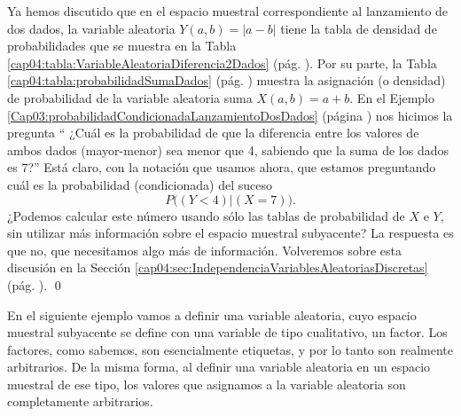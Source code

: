 \begin{Ejemplo}\label{cap04:ejem:VariablesAleatoriasEliminanInformacion}
    Ya hemos discutido que en el espacio muestral correspondiente al lanzamiento de dos dados, la variable aleatoria $Y(a,b)=|a-b|$ tiene la tabla de densidad de probabilidades que se muestra en la Tabla \ref{cap04:tabla:VariableAleatoriaDiferencia2Dados} (pág. \pageref{cap04:tabla:VariableAleatoriaDiferencia2Dados}).
    Por su parte, la Tabla \ref{cap04:tabla:probabilidadSumaDados} (pág. \pageref{cap04:tabla:probabilidadSumaDados}) muestra la asignación (o densidad) de probabilidad de la variable aleatoria suma $X(a,b)=a+b$.
    En el Ejemplo \ref{Cap03:probabilidadCondicionadaLanzamientoDosDados} (página \pageref{Cap03:probabilidadCondicionadaLanzamientoDosDados}) nos hicimos la pregunta `` ¿Cuál es la probabilidad de que la diferencia entre los valores de ambos dados (mayor-menor) sea menor que 4, sabiendo que la suma de los dados es 7?''  Está claro, con la notación que usamos ahora, que estamos preguntando cuál es la probabilidad (condicionada) del suceso
    \[P\Big((Y<4)|(X=7)\Big).\]
    ¿Podemos calcular este número usando sólo las tablas de probabilidad de $X$ e $Y$, sin utilizar más información sobre el espacio muestral subyacente? La respuesta es que no, que necesitamos algo más de información. Volveremos sobre esta discusión en la Sección \ref{cap04:sec:IndependenciaVariablesAleatoriasDiscretas} (pág. \pageref{cap04:sec:IndependenciaVariablesAleatoriasDiscretas}).
    \qed
\end{Ejemplo}
En el siguiente ejemplo vamos a definir una variable aleatoria, cuyo espacio muestral subyacente se define con una variable de tipo cualitativo, un factor. Los factores, como sabemos, son  esencialmente etiquetas, y por lo tanto son realmente arbitrarios.  De la misma forma, al definir una variable aleatoria en un espacio muestral de ese tipo, los valores que asignamos a la variable aleatoria son completamente arbitrarios.
